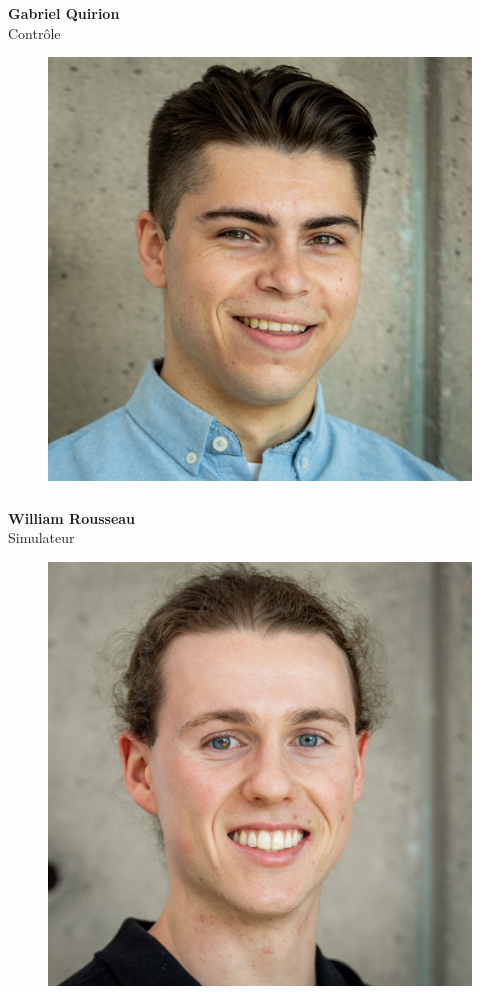 \documentclass[a0paper,portrait]{baposter}
\begin{document}
\begin{poster}
{\subsubsection*{}
\vspace{2mm}
\textbf{Gabriel Quirion}\\
Contrôle

\begin{figure}
\includegraphics[width=.9\linewidth]{img/membres/William-Rousseau-2.jpg} 
\end{figure}
\subsubsection*{}
\vspace{2mm}
\textbf{William Rousseau}\\
Simulateur

\begin{figure}
\includegraphics[width=.9\linewidth]{img/membres/Louis-Tardif-3.jpg} 
\end{figure}
}
\end{poster}
\end{document}
